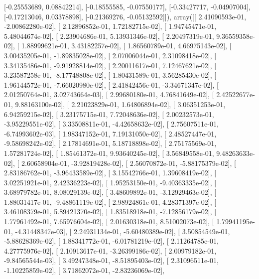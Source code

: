\documentclass{article}
\begin{document}
       [-0.25553689,  0.08842214],
       [-0.18555585, -0.07550177],
       [-0.33427717, -0.04907004],
       [-0.17213046,  0.03378898],
       [-0.21369276, -0.05132592]]), array([[  2.41090593e-01,  -2.00862280e-02],
       [  2.12896852e-01,   1.72182715e-02],
       [  1.94745471e-01,   5.48044674e-02],
       [  2.23904686e-01,   5.13931346e-02],
       [  2.20497319e-01,   9.36559358e-02],
       [  1.88999621e-01,   3.43182257e-02],
       [  1.86560789e-01,   4.66975143e-02],
       [  3.00435205e-01,  -1.89835028e-02],
       [  2.07006044e-01,   2.31098418e-02],
       [  3.34135486e-01,  -9.91928814e-02],
       [  2.20011617e-01,   7.12467621e-02],
       [  3.23587258e-01,  -8.17748808e-02],
       [  1.80431589e-01,   3.56285430e-02],
       [  1.96144572e-01,  -7.66020980e-02],
       [  2.41842456e-01,  -3.34671347e-02],
       [  2.01250764e-01,   3.02743664e-03],
       [  2.99680180e-01,   4.76841649e-02],
       [  2.42522677e-01,   9.88163100e-02],
       [  2.21023829e-01,   1.64806894e-02],
       [  3.06351253e-01,   6.94259215e-02],
       [  3.23175715e-01,   7.72048636e-02],
       [  2.00232573e-01,  -3.95229551e-02],
       [  3.33508811e-01,  -4.42658632e-02],
       [  2.75607511e-01,  -6.74993602e-03],
       [  1.98347152e-01,   7.19131050e-02],
       [  2.48527447e-01,  -9.58698242e-02],
       [  2.17814691e-01,   5.18718898e-02],
       [  2.75175569e-01,   1.57281724e-02],
       [  1.85461372e-01,   9.93640245e-02],
       [  3.56849558e-01,   9.48263633e-02],
       [  2.60658904e-01,  -3.92819428e-02],
       [  2.56070872e-01,  -5.88175379e-02],
       [  2.83186762e-01,  -3.96433589e-02],
       [  3.15542766e-01,   1.39608419e-02],
       [  3.02251921e-01,   2.42336223e-02],
       [  1.95253150e-01,  -9.40363335e-02],
       [  3.68979782e-01,   8.08029139e-02],
       [  3.48609892e-01,  -3.12929463e-02],
       [  1.88031417e-01,  -9.48861119e-02],
       [  2.98924861e-01,   4.28371397e-02],
       [  3.46108379e-01,   5.89421370e-02],
       [  1.83518918e-01,  -7.12856179e-02],
       [  1.77961492e-01,   7.65976604e-02],
       [  2.01630318e-01,   8.51002073e-02],
       [  1.79941195e-01,  -4.31448347e-03],
       [  2.24931134e-01,  -5.60480389e-02],
       [  3.50854549e-01,  -5.88628369e-02],
       [  1.88341772e-01,  -6.01781219e-02],
       [  2.11264785e-01,   4.27775976e-02],
       [  2.10913617e-01,  -3.26399186e-02],
       [  2.00979182e-01,  -9.84565544e-03],
       [  3.49247348e-01,  -8.51895403e-02],
       [  2.31096511e-01,  -1.10225859e-02],
       [  3.71862072e-01,  -2.83236069e-02],
\end{document}
